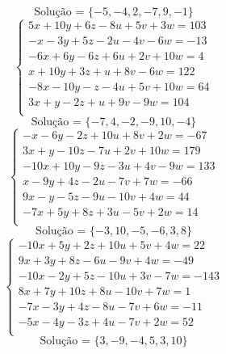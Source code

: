 \documentclass[12pt,oneside,a4paper]{article}
\begin{document}
\begin{equation*}
\text{Solução = }\{-5,-4,2,-7,9,-1\}
\end{equation*}
\vspace{\baselineskip}
\begin{equation*}
\begin{cases}
5x+10y+6z-8u+5v+3w=103 \\
-x-3y+5z-2u-4v-6w=-13 \\
-6x+6y-6z+6u+2v+10w=4 \\
x+10y+3z+u+8v-6w=122 \\
-8x-10y-z-4u+5v+10w=64 \\
3x+y-2z+u+9v-9w=104 \\
\end{cases}
\end{equation*}
\begin{equation*}
\text{Solução = }\{-7,4,-2,-9,10,-4\}
\end{equation*}
\vspace{\baselineskip}
\begin{equation*}
\begin{cases}
-x-6y-2z+10u+8v+2w=-67 \\
3x+y-10z-7u+2v+10w=179 \\
-10x+10y-9z-3u+4v-9w=133 \\
x-9y+4z-2u-7v+7w=-66 \\
9x-y-5z-9u-10v+4w=44 \\
-7x+5y+8z+3u-5v+2w=14 \\
\end{cases}
\end{equation*}
\begin{equation*}
\text{Solução = }\{-3,10,-5,-6,3,8\}
\end{equation*}
\vspace{\baselineskip}
\begin{equation*}
\begin{cases}
-10x+5y+2z+10u+5v+4w=22 \\
9x+3y+8z-6u-9v+4w=-49 \\
-10x-2y+5z-10u+3v-7w=-143 \\
8x+7y+10z+8u-10v+7w=1 \\
-7x-3y+4z-8u-7v+6w=-11 \\
-5x-4y-3z+4u-7v+2w=52 \\
\end{cases}
\end{equation*}
\begin{equation*}
\text{Solução = }\{3,-9,-4,5,3,10\}
\end{equation*}
\end{document}
